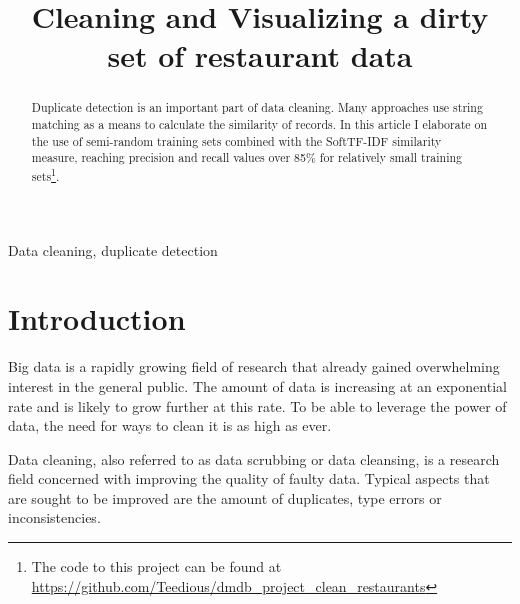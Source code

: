 \documentclass[conference]{IEEEtran}
\begin{document}
\title{Cleaning and Visualizing a dirty set of restaurant data}


\author{
}

\maketitle

\begin{abstract}
Duplicate detection is an important part of data cleaning. Many approaches use string matching as a means to calculate the similarity of records. In this article I elaborate on the use of semi-random training sets combined with the SoftTF-IDF similarity measure, reaching precision and recall values over 85\% for relatively small training sets\footnote{The code to this project can be found at \url{https://github.com/Teedious/dmdb_project_clean_restaurants}}.
\end{abstract}

\begin{IEEEkeywords}
Data cleaning, duplicate detection
\end{IEEEkeywords}

\section{Introduction}
Big data is a rapidly growing field of research that already gained overwhelming interest in the general public. The amount of data is increasing at an exponential rate and is likely to grow further at this rate. To be able to leverage the power of data, the need for ways to clean it is as high as ever.

Data cleaning, also referred to as data scrubbing or data cleansing, is a research field concerned with improving the quality of faulty data. Typical aspects that are sought to be improved are the amount of duplicates, type errors or inconsistencies\cite{Bilenko.2003}.
\end{document}
